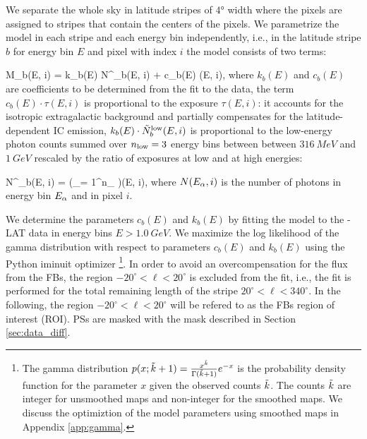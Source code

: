 We separate the whole sky in latitude stripes of $\ang{4}$ width where the \Healpix pixels are assigned to stripes that contain the centers of the pixels.
We parametrize the model in each stripe and each energy bin independently, i.e., 
in the latitude stripe $b$ for energy bin $E$ and \Healpix pixel with index $i$ the model consists of two terms:

\be
{}
M_{b}(E, i) = k_{b}(E) \cdot \tilde N^\low_{b}(E, i) + c_b(E) \cdot \tau(E, i),
\ee
where $k_{b}(E)$ and $c_b(E)$ are coefficients to be determined from the fit to the data,
the term $c_b(E) \cdot \tau(E, i)$ is proportional to the exposure $\tau(E, i)$: it accounts for the isotropic extragalactic background and partially compensates for 
the latitude-dependent IC emission,
$k_{b}(E) \cdot \tilde N^{\text{low}}_b(E, i)$ is proportional to the low-energy photon counts summed over 
$n_{\text{low}} = 3$ energy bins between between $\SI{316}{MeV}$ and $\SI{1}{GeV}$ 
rescaled by the ratio of exposures at low and at high energies:

\be
\tilde N^\low_b(E, i) =  \left(\sum_{\alpha = 1}^{n_\low}  \right)\tau(E, i),
\ee
where $N(E_\alpha, i)$ is the number of photons in energy bin $E_\alpha$ and in pixel $i$.

We determine the parameters $c_{b}(E)$ and $k_{b}(E)$ by fitting the model to the \Fermi-LAT data in energy bins $E > \SI{1.0}{GeV}$.
We maximize the log likelihood of the gamma distribution 
with respect to parameters $c_{b}(E)$ and $k_{b}(E)$
using the Python iminuit optimizer%
\footnote{
The gamma distribution $p(x; \tilde{k} + 1) = \frac{x^{\tilde{k}}}{\Gamma (\tilde{k} + 1)}e^{-x}$ is the probability density function
for the parameter $x$ given the observed counts $\tilde{k}$.
The counts $\tilde{k}$ are integer for unsmoothed maps and non-integer for the smoothed maps.
We discuss the optimiztion of the model parameters using smoothed maps in 
Appendix \ref{app:gamma}.
}.
In order to avoid an overcompensation 
for the flux from the FBs, the region $-20^\circ < \ell < 20^\circ$
is excluded from the fit, i.e., the fit is performed for 
the total remaining length of the stripe $20^\circ < \ell < 340^\circ$.
In the following, the region $-20^\circ < \ell < 20^\circ$ will be refered to as the FBs region of interest (ROI).
PSs are masked with the mask described in Section \ref{sec:data_diff}.


